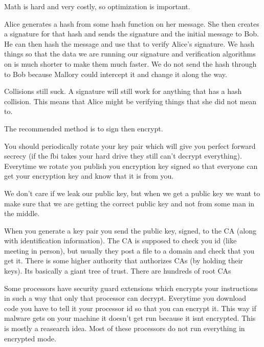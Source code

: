 \documentclass{article}
\begin{document}

Math is hard and very costly, so optimization is important.

Alice generates a hash from some hash function on her message. She then creates a signature for that hash and sends the signature and the initial message to Bob. He can then hash the message and use that to verify Alice's signature. We hash things so that the data we are running our signature and verification algorithms on is much shorter to make them much faster. We do not send the hash through to Bob because Mallory could intercept it and change it along the way.

Collisions still suck. A signature will still work for anything that has a hash collision. This means that Alice might be verifying things that she did not mean to. 


The recommended method is to sign then encrypt.


You should periodically rotate your key pair which will give you perfect forward secrecy (if the fbi takes your hard drive they still can't decrypt everything). Everytime we rotate you publish you encryption key signed so that everyone can get your encryption key and know that it is from you.


We don't care if we leak our public key, but when we get a public key we want to make sure that we are getting the correct public key and not from some man in the middle. 



When you generate a key pair you send the public key, signed, to the CA (along with identification information). The CA is supposed to check you id (like meeting in person), but usually they post a file to a domain and check that you get it. There is some higher authority that authorizes CAs (by holding their keys). Its basically a giant tree of trust. There are hundreds of root CAs






Some processors have security guard extensions which encrypts your instructions in such a way that only that processor can decrypt. Everytime you download code you have to tell it your processor id so that you can encrypt it. This way if malware gets on your machine it doesn't get run because it isnt encrypted. This is mostly a reasearch idea. Most of these processors do not run everything in encrypted mode.
\end{document}
